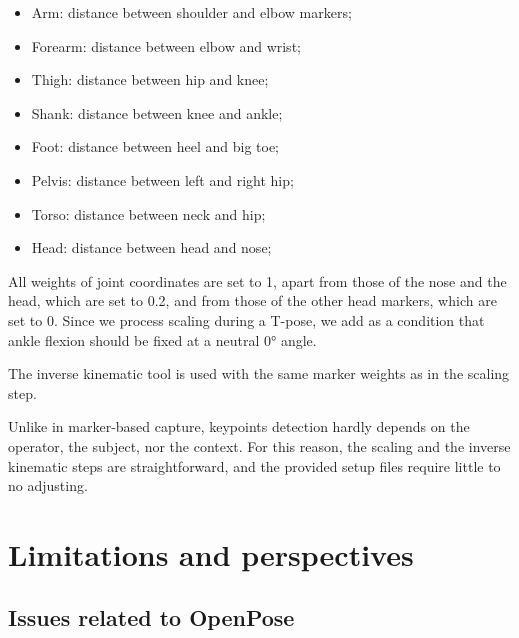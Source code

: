 \clearpage

\begin{itemize}[itemsep=0em, topsep=0em, leftmargin=*]
      \item{Arm: distance between shoulder and elbow markers;}
      \item{Forearm: distance between elbow and wrist;}
      \item{Thigh: distance between hip and knee;}
      \item{Shank: distance between knee and ankle;}
      \item{Foot: distance between heel and big toe;}
      \item{Pelvis: distance between left and right hip;}
      \item{Torso: distance between neck and hip;}
      \item{Head: distance between head and nose;}
\end{itemize}
All weights of joint coordinates are set to 1, apart from those of the nose and the head, which are set to 0.2, and from those of the other head markers, which are set to 0. Since we process scaling during a T-pose, we add as a condition that ankle flexion should be fixed at a neutral 0° angle.

The inverse kinematic tool is used with the same marker weights as in the scaling step.

Unlike in marker-based capture, keypoints detection hardly depends on the operator, the subject, nor the context. For this reason, the scaling and the inverse kinematic steps are straightforward, and the provided setup files require little to no adjusting.


\section{Limitations and perspectives} \label{ch3_lim}

\subsection{Issues related to OpenPose}

